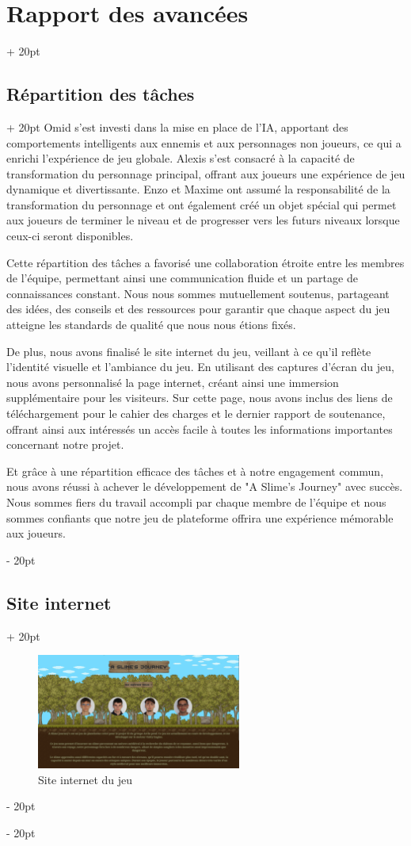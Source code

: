 \documentclass[a4paper, 12pt, twoside]{article}
\newcommand{\ind}[1][20pt]{\advance\leftskip + #1}
\newcommand{\deind}[1][20pt]{\advance\leftskip - #1}
\newenvironment{indt}[2][20pt]{#2 \par \ind[#1]}{\par \deind} %
\begin{document}
\begin{indt}{\section{Rapport des avancées}}
\begin{indt}{\subsection{Répartition des tâches}}
            Omid s'est investi dans la mise en place de l'IA, apportant des comportements intelligents aux ennemis et aux personnages non joueurs, ce qui a enrichi l'expérience de jeu globale. Alexis s'est consacré à la capacité de transformation du personnage principal, offrant aux joueurs une expérience de jeu dynamique et divertissante. Enzo et Maxime ont assumé la responsabilité de la transformation du personnage et ont également créé un objet spécial qui permet aux joueurs de terminer le niveau et de progresser vers les futurs niveaux lorsque ceux-ci seront disponibles.

            Cette répartition des tâches a favorisé une collaboration étroite entre les membres de l'équipe, permettant ainsi une communication fluide et un partage de connaissances constant. Nous nous sommes mutuellement soutenus, partageant des idées, des conseils et des ressources pour garantir que chaque aspect du jeu atteigne les standards de qualité que nous nous étions fixés.

            De plus, nous avons finalisé le site internet du jeu, veillant à ce qu'il reflète l'identité visuelle et l'ambiance du jeu. En utilisant des captures d'écran du jeu, nous avons personnalisé la page internet, créant ainsi une immersion supplémentaire pour les visiteurs. Sur cette page, nous avons inclus des liens de téléchargement pour le cahier des charges et le dernier rapport de soutenance, offrant ainsi aux intéressés un accès facile à toutes les informations importantes concernant notre projet.

            Et grâce à une répartition efficace des tâches et à notre engagement commun, nous avons réussi à achever le développement de "A Slime's Journey" avec succès. Nous sommes fiers du travail accompli par chaque membre de l'équipe et nous sommes confiants que notre jeu de plateforme offrira une expérience mémorable aux joueurs.
        \end{indt}

        \newpage

        \begin{indt}{\subsection{Site internet}}
            \begin{figure}[h]
                \centering
                \includegraphics[width=0.6\textwidth]{Site2.png}
                \caption{Site internet du jeu}
                \label{fig:mesh1}
            \end{figure}


\end{indt}
\end{indt}
\end{document}
